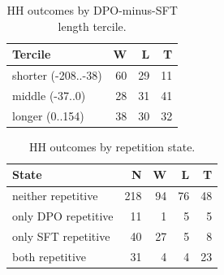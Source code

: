 \begin{table}[t]\centering\footnotesize\caption{HH outcomes by DPO-minus-SFT length tercile.}\label{tab:hh-length}\begin{tabular}{lrrr}\toprule Tercile & W & L & T\\\midrule
shorter (-208..-38) & 60 & 29 & 11\\
middle (-37..0) & 28 & 31 & 41\\
longer (0..154) & 38 & 30 & 32\\
\bottomrule\end{tabular}\end{table}
\begin{table}[t]\centering\footnotesize\caption{HH outcomes by repetition state.}\label{tab:hh-repetition}\begin{tabular}{lrrrr}\toprule State & N & W & L & T\\\midrule
neither repetitive & 218 & 94 & 76 & 48\\
only DPO repetitive & 11 & 1 & 5 & 5\\
only SFT repetitive & 40 & 27 & 5 & 8\\
both repetitive & 31 & 4 & 4 & 23\\
\bottomrule\end{tabular}\end{table}
